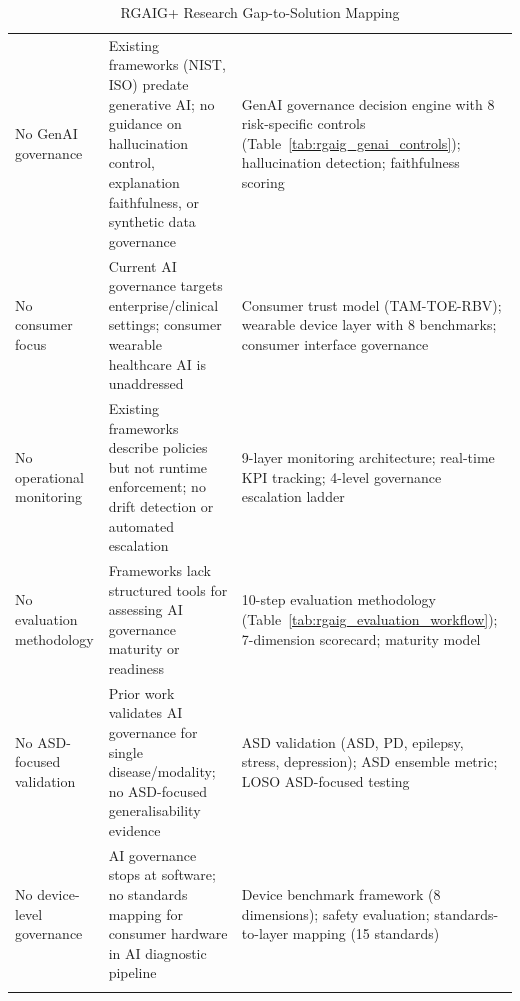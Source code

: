 \begingroup\singlespacing\tablefontsize\tablestripes
\begin{xltabular}{\textwidth}{@{} p{0.16\textwidth} X X @{}}
\caption{RGAIG+ Research Gap-to-Solution Mapping}
\label{tab:rgaig_gap_solution}\\
\toprule
{} &  &  \\
\midrule
\endfirsthead
\endhead
\bottomrule
\endlastfoot
No GenAI governance      & Existing frameworks (NIST, ISO) predate generative AI; no guidance on hallucination control, explanation faithfulness, or synthetic data governance & GenAI governance decision engine with 8 risk-specific controls (Table~\ref{tab:rgaig_genai_controls}); hallucination detection; faithfulness scoring \\
\addlinespace
No consumer focus        & Current AI governance targets enterprise/clinical settings; consumer wearable healthcare AI is unaddressed & Consumer trust model (TAM-TOE-RBV); wearable device layer with 8 benchmarks; consumer interface governance \\
\addlinespace
No operational monitoring & Existing frameworks describe policies but not runtime enforcement; no drift detection or automated escalation & 9-layer monitoring architecture; real-time KPI tracking; 4-level governance escalation ladder \\
\addlinespace
No evaluation methodology & Frameworks lack structured tools for assessing AI governance maturity or readiness & 10-step evaluation methodology (Table~\ref{tab:rgaig_evaluation_workflow}); 7-dimension scorecard; maturity model \\
\addlinespace
No ASD-focused validation & Prior work validates AI governance for single disease/modality; no ASD-focused generalisability evidence & ASD validation (ASD, PD, epilepsy, stress, depression); ASD ensemble metric; LOSO ASD-focused testing \\
\addlinespace
No device-level governance & AI governance stops at software; no standards mapping for consumer hardware in AI diagnostic pipeline & Device benchmark framework (8 dimensions); safety evaluation; standards-to-layer mapping (15 standards) \\
\addlinespace
\midrule
{} \\
\end{xltabular}
\endgroup

